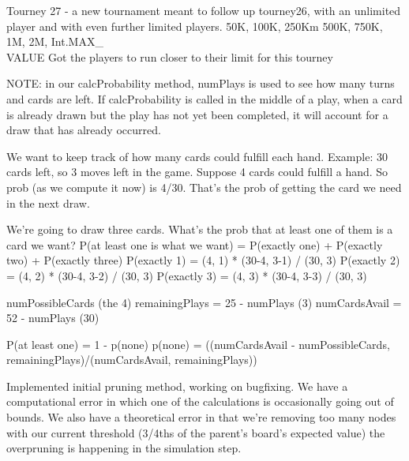 \documentclass[letterpaper]{article}
\begin{document}
Tourney 27 - a new tournament meant to follow up tourney26, with an unlimited player and with even further limited players.
	50K, 100K, 250Km 500K, 750K, 1M, 2M, Int.MAX\_\\VALUE
Got the players to run closer to their limit for this tourney 

NOTE: in our calcProbability method, numPlays is used to see how many turns and cards are left. If calcProbability is called in the middle of a play, when a card is already drawn but the play has not yet been completed, it will account for a draw that has already occurred.

We want to keep track of how many cards could fulfill each hand. Example: 30 cards left, so 3 moves left in the game. Suppose 4 cards could fulfill a hand. So prob (as we compute it now) is 4/30. That’s the prob of getting the card we need in the next draw.

We’re going to draw three cards. What’s the prob that at least one of them is a card we want?
P(at least one is what we want) = P(exactly one) + P(exactly two) + P(exactly three)
P(exactly 1) = (4, 1) * (30-4, 3-1) / (30, 3)
P(exactly 2) = (4, 2) * (30-4, 3-2) / (30, 3)
P(exactly 3) = (4, 3) * (30-4, 3-3) / (30, 3)



numPossibleCards (the 4)
remainingPlays = 25 - numPlays   (3)
numCardsAvail = 52 - numPlays   (30)

P(at least one) = 
1 - p(none)
p(none) = ((numCardsAvail - numPossibleCards, remainingPlays)/(numCardsAvail, remainingPlays))

Implemented initial pruning method, working on bugfixing. We have a computational error in which one of the calculations is occasionally going out of bounds. We also have a theoretical error in that we’re removing too many nodes with our current threshold (3/4ths of the parent’s board’s expected value) the overpruning is happening in the simulation step.
\end{document}
